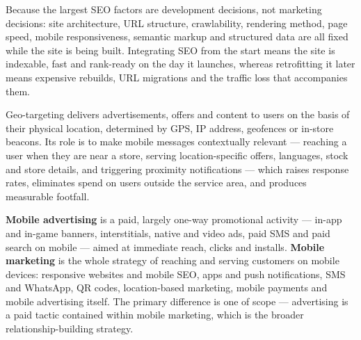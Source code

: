 \begin{qlist}

Because the largest SEO factors are development decisions, not marketing
decisions: site architecture, URL structure, crawlability, rendering method,
page speed, mobile responsiveness, semantic markup and structured data are all
fixed while the site is being built. Integrating SEO from the start means the
site is indexable, fast and rank-ready on the day it launches, whereas
retrofitting it later means expensive rebuilds, URL migrations and the traffic
loss that accompanies them.

Geo-targeting delivers advertisements, offers and content to users on the basis
of their physical location, determined by GPS, IP address, geofences or
in-store beacons. Its role is to make mobile messages contextually relevant ---
reaching a user when they are near a store, serving location-specific offers,
languages, stock and store details, and triggering proximity notifications ---
which raises response rates, eliminates spend on users outside the service
area, and produces measurable footfall.

\textbf{Mobile advertising} is a paid, largely one-way promotional activity ---
in-app and in-game banners, interstitials, native and video ads, paid SMS and
paid search on mobile --- aimed at immediate reach, clicks and installs.
\textbf{Mobile marketing} is the whole strategy of reaching and serving
customers on mobile devices: responsive websites and mobile SEO, apps and push
notifications, SMS and WhatsApp, QR codes, location-based marketing, mobile
payments and mobile advertising itself. The primary difference is one of scope
--- advertising is a paid tactic contained within mobile marketing, which is
the broader relationship-building strategy.


\end{qlist}
